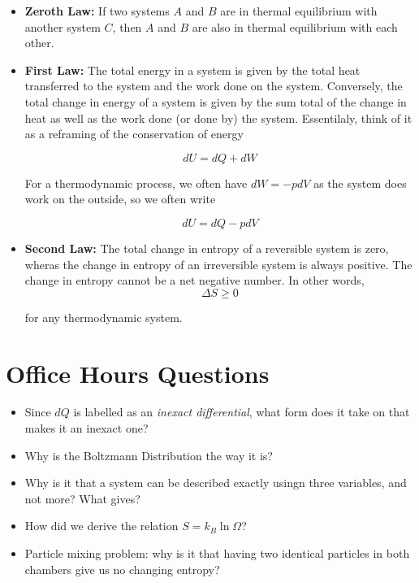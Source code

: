 \documentclass[10pt]{article}
\begin{document}
    \begin{itemize}
        \item \textbf{Zeroth Law:} If two systems $A$ and $B$ are in thermal equilibrium with another system $C$, then $A$ and $B$ are also in thermal equilibrium with each other.
        \item \textbf{First Law:} The total energy in a system is given by the total heat transferred to the system and the work done on the system. Conversely, the total change in energy of a system is given by the sum total of the change in heat as well as the work done (or done by) the system. Essentilaly, think of it as a reframing of the conservation of energy
        
        \[ dU = dQ + dW\] 

        For a thermodynamic process, we often have $dW = - pdV$ as the system does work on the outside, so we often write 

        \[ dU = dQ - pdV\]

        \item \textbf{Second Law:} The total change in entropy of a reversible system is zero, wheras the change in entropy of an irreversible system is always positive. The change in entropy cannot be a net negative number. In other words,
        \[ \Delta S \ge 0\] 

        for any thermodynamic system. 
    \end{itemize}


    \section*{Office Hours Questions}

    \begin{itemize}
        \item Since $dQ$ is labelled as an \textit{inexact differential}, what form does it take on that makes it an inexact one?
        \item Why is the Boltzmann Distribution the way it is?
        \item Why is it that a system can be described exactly usingn three variables, and not more? What gives?
        \item How did we derive the relation $S = k_B \ln \Omega$?
        \item Particle mixing problem: why is it that having two identical particles in both chambers give us no changing entropy? 
    \end{itemize}
\end{document}
